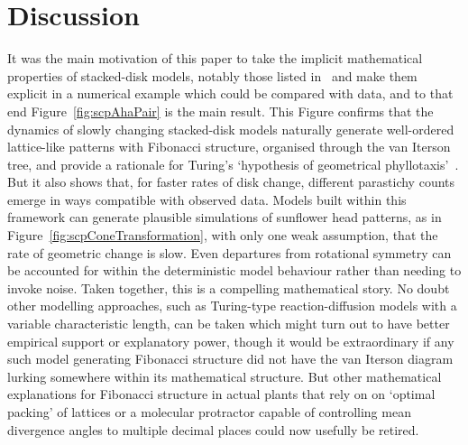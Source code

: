 \documentclass[a4paper,10pt]{amsart}
\begin{document}
\section{Discussion}
It was the main motivation of this paper to take the implicit mathematical properties of stacked-disk models, notably those listed in~\cite{goleFibonacciQuasisymmetricPhyllotaxis2016} and make them explicit in a numerical example which could be compared with data, and to that end Figure~\ref{fig:scpAhaPair} is the main result. This Figure confirms that the dynamics of slowly changing stacked-disk models naturally generate well-ordered lattice-like patterns with Fibonacci structure, organised through the van Iterson tree, and provide a rationale for Turing's `hypothesis of geometrical phyllotaxis'~\cite{turingMorphogenTheoryPhyllotaxis2013,swintonMathematicalPhyllotaxis2023}. But it also shows that, for faster rates of disk change, different parastichy counts emerge in ways compatible with observed data.  Models built within this framework can generate plausible simulations of sunflower head patterns, as in Figure~\ref{fig:scpConeTransformation}, with  only one weak assumption, that the rate of geometric change is slow.  Even departures from rotational symmetry can be accounted for within the deterministic model behaviour rather than needing to invoke noise.
Taken together, this is a compelling mathematical story. No doubt other modelling approaches, such as Turing-type reaction-diffusion models with a variable characteristic length,  can be taken which might turn out to have better empirical support or explanatory power, though it would be extraordinary if any such model generating Fibonacci structure did not have the van Iterson diagram lurking somewhere within its mathematical structure. But 
  other mathematical explanations for Fibonacci structure in actual plants that rely on 
   on `optimal packing' of lattices or a molecular protractor capable of controlling mean divergence angles to multiple decimal places could now usefully be retired.
   
\end{document}
